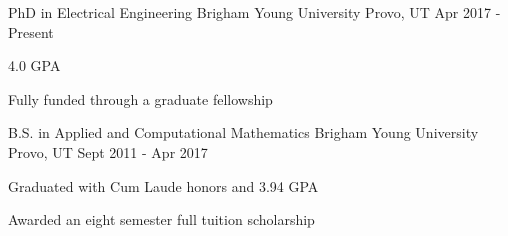 

\begin{cventries}

  \cventry
    {PhD in Electrical Engineering} %
    {Brigham Young University} %
    {Provo, UT} %
    {Apr 2017 - Present} %
    {
      \begin{cvitems}
        \item {4.0 GPA}
        \item {Fully funded through a graduate fellowship}
      \end{cvitems}
    }

  \cventry
    {B.S. in Applied and Computational Mathematics} %
    {Brigham Young University} %
    {Provo, UT} %
    {Sept 2011 - Apr 2017} %
    {
      \begin{cvitems} %
        \item {Graduated with Cum Laude honors and 3.94 GPA}
        \item {Awarded an eight semester full tuition scholarship}
      \end{cvitems}
    }

\end{cventries}
